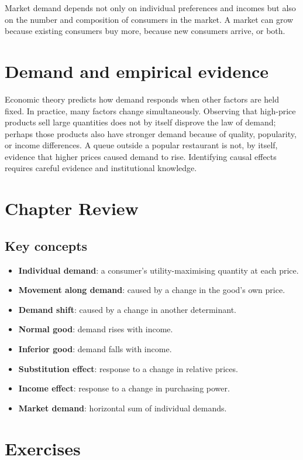 Market demand depends not only on individual preferences and incomes but also
on the number and composition of consumers in the market. A market can grow
because existing consumers buy more, because new consumers arrive, or both.

\section{Demand and empirical evidence}

Economic theory predicts how demand responds when other factors are held
fixed. In practice, many factors change simultaneously. Observing that
high-price products sell large quantities does not by itself disprove the law
of demand; perhaps those products also have stronger demand because of
quality, popularity, or income differences. A queue outside a popular
restaurant is not, by itself, evidence that higher prices caused demand to
rise. Identifying causal effects requires careful evidence and institutional
knowledge.

\section*{Chapter Review}

\subsection*{Key concepts}
\begin{itemize}
  \item \textbf{Individual demand}: a consumer's utility-maximising quantity at each price.
  \item \textbf{Movement along demand}: caused by a change in the good's own price.
  \item \textbf{Demand shift}: caused by a change in another determinant.
  \item \textbf{Normal good}: demand rises with income.
  \item \textbf{Inferior good}: demand falls with income.
  \item \textbf{Substitution effect}: response to a change in relative prices.
  \item \textbf{Income effect}: response to a change in purchasing power.
  \item \textbf{Market demand}: horizontal sum of individual demands.
\end{itemize}

\section*{Exercises}

